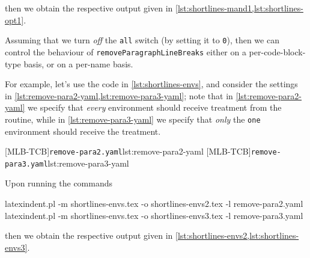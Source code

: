 	then we obtain the respective output given in
	\cref{lst:shortlines-mand1,lst:shortlines-opt1}.


	Assuming that we turn \emph{off} the \texttt{all} switch (by setting it to \texttt{0}),
	then we can control the behaviour of \texttt{removeParagraphLineBreaks} either on a
	per-code-block-type basis, or on a per-name basis.

	For example, let's use the code in \cref{lst:shortlines-envs}, and consider the settings
	in \cref{lst:remove-para2-yaml,lst:remove-para3-yaml}; note that in
	\cref{lst:remove-para2-yaml} we specify that \emph{every} environment should receive
	treatment from the routine, while in \cref{lst:remove-para3-yaml} we specify that
	\emph{only} the \texttt{one} environment should receive the treatment.

	\begin{minipage}{.45\linewidth}
	\end{minipage}
	\hfill
	\begin{minipage}{.49\linewidth}
		[MLB-TCB]{\texttt{remove-para2.yaml}}{lst:remove-para2-yaml}
		[MLB-TCB]{\texttt{remove-para3.yaml}}{lst:remove-para3-yaml}
	\end{minipage}

	Upon running the commands
	\begin{widepage}
		\begin{commandshell}
latexindent.pl -m shortlines-envs.tex -o shortlines-envs2.tex -l remove-para2.yaml
latexindent.pl -m shortlines-envs.tex -o shortlines-envs3.tex -l remove-para3.yaml
\end{commandshell}
	\end{widepage}
	then we obtain the respective output given in
	\cref{lst:shortlines-envs2,lst:shortlines-envs3}.


